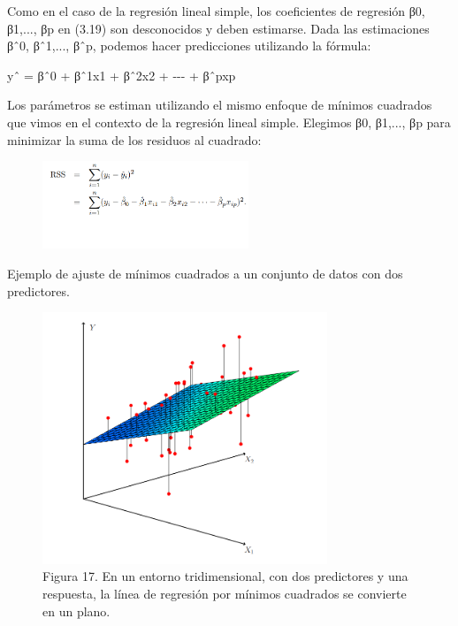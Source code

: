 \documentclass[
  letterpaper,
  DIV=11,
  numbers=noendperiod]{scrartcl}
\begin{document}
Como en el caso de la regresión lineal simple, los coeficientes de
regresión β0, β1,..., βp en (3.19) son desconocidos y deben estimarse.
Dada las estimaciones βˆ0, βˆ1,..., βˆp, podemos hacer predicciones
utilizando la fórmula:

yˆ = βˆ0 + βˆ1x1 + βˆ2x2 + -\/-\/- + βˆpxp

Los parámetros se estiman utilizando el mismo enfoque de mínimos
cuadrados que vimos en el contexto de la regresión lineal simple.
Elegimos β0, β1,..., βp para minimizar la suma de los residuos al
cuadrado:

\begin{figure}

{\centering \includegraphics[width=2.42708in,height=\textheight]{images/fig16.png}

}

\end{figure}

Ejemplo de ajuste de mínimos cuadrados a un conjunto de datos con dos
predictores.

\begin{figure}

{\centering \includegraphics[width=3.35417in,height=\textheight]{images/fig17.png}

}

\caption{Figura 17. En un entorno tridimensional, con dos predictores y
una respuesta, la línea de regresión por mínimos cuadrados se convierte
en un plano.}

\end{figure}
\end{document}
